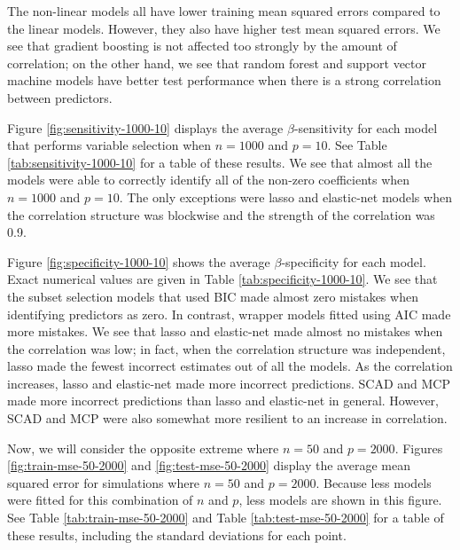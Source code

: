 \documentclass{article}
\begin{document}
The non-linear models all have lower training mean squared errors compared to the linear models. However, they also have higher test mean squared errors. We see that gradient boosting is not affected too strongly by the amount of correlation; on the other hand, we see that random forest and support vector machine models have better test performance when there is a strong correlation between predictors.

Figure \ref{fig:sensitivity-1000-10} displays the average $\beta$-sensitivity for each model that performs variable selection when $n = 1000$ and $p = 10$. See Table \ref{tab:sensitivity-1000-10} for a table of these results. We see that almost all the models were able to correctly identify all of the non-zero coefficients when $n = 1000$ and $p = 10$. The only exceptions were lasso and elastic-net models when the correlation structure was blockwise and the strength of the correlation was 0.9.

Figure \ref{fig:specificity-1000-10} shows the average $\beta$-specificity for each model. Exact numerical values are given in Table \ref{tab:specificity-1000-10}. We see that the subset selection models that used BIC made almost zero mistakes when identifying predictors as zero. In contrast, wrapper models fitted using AIC made more mistakes. We see that lasso and elastic-net made almost no mistakes when the correlation was low; in fact, when the correlation structure was independent, lasso made the fewest incorrect estimates out of all the models. As the correlation increases, lasso and elastic-net made more incorrect predictions. SCAD and MCP made more incorrect predictions than lasso and elastic-net in general. However, SCAD and MCP were also somewhat more resilient to an increase in correlation.

Now, we will consider the opposite extreme where $n = 50$ and $p = 2000$. Figures \ref{fig:train-mse-50-2000} and \ref{fig:test-mse-50-2000} display the average mean squared error for simulations where $n = 50$ and $p = 2000$. Because less models were fitted for this combination of $n$ and $p$, less models are shown in this figure. See Table \ref{tab:train-mse-50-2000} and Table \ref{tab:test-mse-50-2000} for a table of these results, including the standard deviations for each point.
\end{document}
